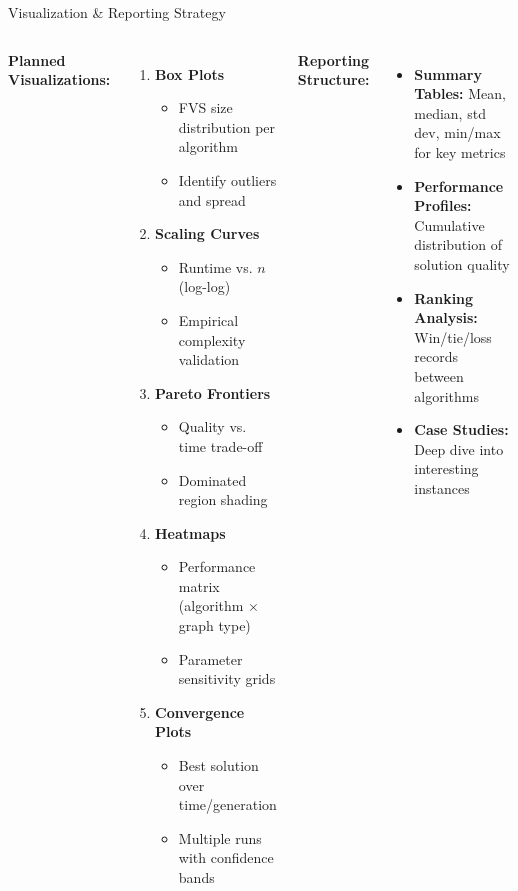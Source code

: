 \documentclass[aspectratio=169]{beamer}
\begin{document}
\begin{frame}{Visualization \& Reporting Strategy}
	\begin{columns}[T]
		\textbf{Planned Visualizations:}
		\begin{enumerate}
			\scriptsize
			\item \textbf{Box Plots}
			      \begin{itemize}
				      \scriptsize
				      \item FVS size distribution per algorithm
				      \item Identify outliers and spread
			      \end{itemize}
			\item \textbf{Scaling Curves}
			      \begin{itemize}
				      \scriptsize
				      \item Runtime vs. $n$ (log-log)
				      \item Empirical complexity validation
			      \end{itemize}
			\item \textbf{Pareto Frontiers}
			      \begin{itemize}
				      \scriptsize
				      \item Quality vs. time trade-off
				      \item Dominated region shading
			      \end{itemize}
			\item \textbf{Heatmaps}
			      \begin{itemize}
				      \scriptsize
				      \item Performance matrix (algorithm $\times$ graph type)
				      \item Parameter sensitivity grids
			      \end{itemize}
			\item \textbf{Convergence Plots}
			      \begin{itemize}
				      \scriptsize
				      \item Best solution over time/generation
				      \item Multiple runs with confidence bands
			      \end{itemize}
		\end{enumerate}

		\textbf{Reporting Structure:}
		\begin{itemize}
			\scriptsize
			\item \textbf{Summary Tables:} Mean, median, std dev, min/max for key metrics
			\item \textbf{Performance Profiles:} Cumulative distribution of solution quality
			\item \textbf{Ranking Analysis:} Win/tie/loss records between algorithms
			\item \textbf{Case Studies:} Deep dive into interesting instances
		\end{itemize}


\end{columns}
\end{frame}
\end{document}
